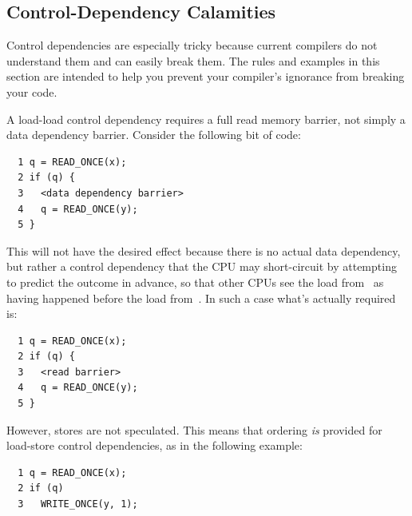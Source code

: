 \subsection{Control-Dependency Calamities}
\label{sec:memorder:Control-Dependency Calamities}

Control dependencies are especially tricky because current compilers
do not understand them and can easily break them.
The rules and examples in this section are intended to help you
prevent your compiler's ignorance from breaking your code.

A load-load control dependency requires a full read memory barrier,
not simply a data dependency barrier.
Consider the following bit of code:

\vspace{5pt}
\begin{minipage}[t]{\columnwidth}
\scriptsize
\begin{verbatim}
  1 q = READ_ONCE(x);
  2 if (q) {
  3   <data dependency barrier>
  4   q = READ_ONCE(y);
  5 }
\end{verbatim}
\end{minipage}
\vspace{5pt}

This will not have the desired effect because there is no actual data
dependency, but rather a control dependency that the CPU may short-circuit
by attempting to predict the outcome in advance, so that other CPUs see
the load from~ as having happened before the load from~.
In such a case what's actually required is:

\vspace{5pt}
\begin{minipage}[t]{\columnwidth}
\scriptsize
\begin{verbatim}
  1 q = READ_ONCE(x);
  2 if (q) {
  3   <read barrier>
  4   q = READ_ONCE(y);
  5 }
\end{verbatim}
\end{minipage}
\vspace{5pt}

However, stores are not speculated.
This means that ordering \emph{is} provided for load-store control
dependencies, as in the following example:

\vspace{5pt}
\begin{minipage}[t]{\columnwidth}
\scriptsize
\begin{verbatim}
  1 q = READ_ONCE(x);
  2 if (q)
  3   WRITE_ONCE(y, 1);
\end{verbatim}
\end{minipage}
\vspace{5pt}

